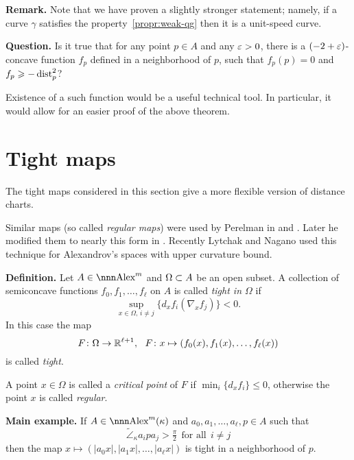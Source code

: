 \documentclass{article}
\begin{document}
\begin{thm}{\bf Remark.}\label{rmk:stronger-unit-speed} {\rm Note that we have proven
a slightly stronger statement; namely, if a curve $\gamma$ satisfies the
property~\ref{propr:weak-qg} then it is a unit-speed curve}.
\end{thm}

\begin{thm}
{\bf Question.} Is it true that for any point $p\in A$ and any $\varepsilon>0$, there is a
$(-2+\varepsilon)$-concave function $f_p$ defined in a neighborhood of $p$, such that $f_p(p)=0$ and
$f_p\geqslant-\operatorname{dist}_p^2$?
\end{thm}

Existence of a such function would be a useful technical tool. 
In particular, it
would allow for an easier proof of the above theorem.







\section{Tight maps}
\setcounter{subsection}{1}
\setcounter{thm}{0}


The tight maps considered in this section give a more flexible version of
distance charts.

Similar maps (so called \emph{regular maps}) were used by Perelman in \cite{perelman:spaces2} and \cite{perelman:morse}.
Later he modified them to nearly this form in \cite{perelman:DC}. 
Recently Lytchak and Nagano used this technique  
for Alexandrov's spaces with upper curvature bound.

\begin{thm}{\bf Definition.}\label{def:tight} Let $A\in \Alex^m$ and $\Omega\subset
A$ be an open subset.
A collection of semiconcave functions
$f_0,f_1,\dots,f_\ell$ on $A$
is called \emph{tight in $\Omega$} if 
$$\sup_{x\in \Omega,\,i\not=j}\{d_x f_i(\nabla_x f_j)\}<0.$$
In this case the map 
$$F\colon\Omega\to \mathbb{R}^{\ell+1},\ \ F\colon x\mapsto (f_0(x),f_1(x),\dots,f_\ell(x))$$
is called \emph{tight}.

A point $x\in\Omega$ is called a \emph{critical point} of $F$ if $\min_i\{d_x f_i\}\le
0$, otherwise the point $x$ is called \emph{regular}.
\end{thm}


\begin{thm}{\bf Main example.} If $A\in\Alex^m(\kappa)$ and
$a_0,a_1,\dots,a_\ell,p\in A$ such that 
$$\tilde\angle_\kappa a_i p a_j>\tfrac\pi2\ \ \text{for all}\ \  i\not=j$$ 
then the map
$x\mapsto (|a_0x|,|a_1x|,\dots,|a_\ell x|)$ is tight in a neighborhood of
$p$.
\end{thm}
\end{document}
